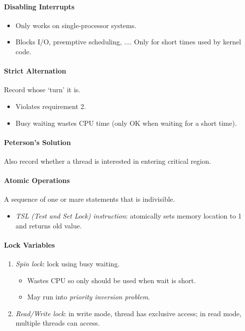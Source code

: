 \documentclass[twocolumn,english]{article}
\begin{document}
\paragraph{Disabling Interrupts}
\begin{itemize}
\item Only works on single-processor systems.
\item Blocks I/O, preemptive scheduling, .... Only for short times used
by kernel code.
\end{itemize}

\paragraph{Strict Alternation}

Record whose `turn' it is.
\begin{itemize}
\item Violates requirement 2.
\item Busy waiting wastes CPU time (only OK when waiting for a short time).
\end{itemize}

\paragraph{Peterson's Solution}

Also record whether a thread is interested in entering critical region.

\paragraph{Atomic Operations}

A sequence of one or mare statements that is indivisible.
\begin{itemize}
\item \emph{TSL (Test and Set Lock) instruction}: atomically sets memory
location to 1 and returns old value.
\end{itemize}

\paragraph{Lock Variables}
\begin{enumerate}
\item \emph{Spin lock}: lock using busy waiting.
\begin{itemize}
\item Wastes CPU so only should be used when wait is short.
\item May run into \emph{priority inversion problem}.
\end{itemize}
\item \emph{Read/Write lock}: in write mode, thread has exclusive access;
in read mode, multiple threads can access.
\end{enumerate}
\end{document}
